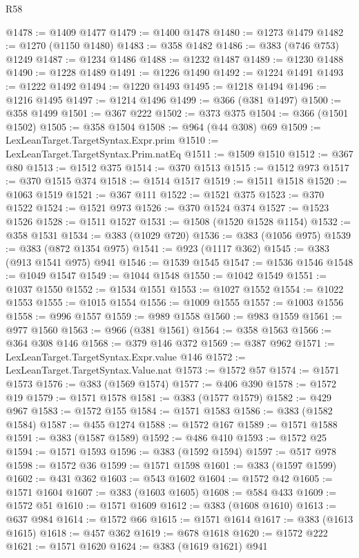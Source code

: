 \begin{lexlean}{R58}
\begin{coremodule}
@1478 := @1409 @1477
@1479 := @1400 @1478
@1480 := @1273 @1479
@1482 := @1270 (@1150 @1480)
@1483 := @358 @1482
@1486 := @383 (@746 @753) @1249
@1487 := @1234 @1486
@1488 := @1232 @1487
@1489 := @1230 @1488
@1490 := @1228 @1489
@1491 := @1226 @1490
@1492 := @1224 @1491
@1493 := @1222 @1492
@1494 := @1220 @1493
@1495 := @1218 @1494
@1496 := @1216 @1495
@1497 := @1214 @1496
@1499 := @366 (@381 @1497)
@1500 := @358 @1499
@1501 := @367 @222
@1502 := @373 @375
@1504 := @366 (@1501 @1502)
@1505 := @358 @1504
@1508 := @964 (@44 @308) @69
@1509 := LexLeanTarget.TargetSyntax.Expr.prim
@1510 := LexLeanTarget.TargetSyntax.Prim.natEq
@1511 := @1509 @1510
@1512 := @367 @80
@1513 := @1512 @375
@1514 := @370 @1513
@1515 := @1512 @973
@1517 := @370 @1515 @374
@1518 := @1514 @1517
@1519 := @1511 @1518
@1520 := @1063 @1519
@1521 := @367 @111
@1522 := @1521 @375
@1523 := @370 @1522
@1524 := @1521 @973
@1526 := @370 @1524 @374
@1527 := @1523 @1526
@1528 := @1511 @1527
@1531 := @1508 (@1520 @1528 @1154)
@1532 := @358 @1531
@1534 := @383 (@1029 @720)
@1536 := @383 (@1056 @975)
@1539 := @383 (@872 @1354 @975)
@1541 := @923 (@1117 @362)
@1545 := @383 (@913 @1541 @975) @941
@1546 := @1539 @1545
@1547 := @1536 @1546
@1548 := @1049 @1547
@1549 := @1044 @1548
@1550 := @1042 @1549
@1551 := @1037 @1550
@1552 := @1534 @1551
@1553 := @1027 @1552
@1554 := @1022 @1553
@1555 := @1015 @1554
@1556 := @1009 @1555
@1557 := @1003 @1556
@1558 := @996 @1557
@1559 := @989 @1558
@1560 := @983 @1559
@1561 := @977 @1560
@1563 := @966 (@381 @1561)
@1564 := @358 @1563
@1566 := @364 @308 @146
@1568 := @379 @146 @372
@1569 := @387 @962
@1571 := LexLeanTarget.TargetSyntax.Expr.value @146
@1572 := LexLeanTarget.TargetSyntax.Value.nat
@1573 := @1572 @57
@1574 := @1571 @1573
@1576 := @383 (@1569 @1574)
@1577 := @406 @390
@1578 := @1572 @19
@1579 := @1571 @1578
@1581 := @383 (@1577 @1579)
@1582 := @429 @967
@1583 := @1572 @155
@1584 := @1571 @1583
@1586 := @383 (@1582 @1584)
@1587 := @455 @1274
@1588 := @1572 @167
@1589 := @1571 @1588
@1591 := @383 (@1587 @1589)
@1592 := @486 @410
@1593 := @1572 @25
@1594 := @1571 @1593
@1596 := @383 (@1592 @1594)
@1597 := @517 @978
@1598 := @1572 @36
@1599 := @1571 @1598
@1601 := @383 (@1597 @1599)
@1602 := @431 @362
@1603 := @543 @1602
@1604 := @1572 @42
@1605 := @1571 @1604
@1607 := @383 (@1603 @1605)
@1608 := @584 @433
@1609 := @1572 @51
@1610 := @1571 @1609
@1612 := @383 (@1608 @1610)
@1613 := @637 @984
@1614 := @1572 @66
@1615 := @1571 @1614
@1617 := @383 (@1613 @1615)
@1618 := @457 @362
@1619 := @678 @1618
@1620 := @1572 @222
@1621 := @1571 @1620
@1624 := @383 (@1619 @1621) @941

\end{coremodule}
\end{lexlean}

